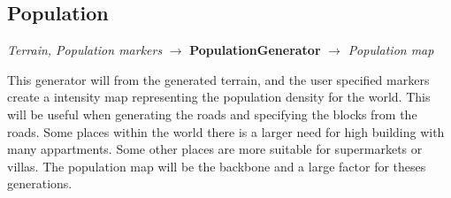 \subsection{Population}
\begin{center}
    \textit{Terrain, Population markers} $\rightarrow$ \textbf{PopulationGenerator} $\rightarrow$ \textit{Population map} 
\end{center}
This generator will from the generated terrain, and the user specified markers create a intensity map representing the population density for the world.
This will be useful when generating the roads and specifying the blocks from the roads. 
Some places within the world there is a larger need for high building with many appartments. 
Some other places are more suitable for supermarkets or villas. 
The population map will be the backbone and a large factor for theses generations. 